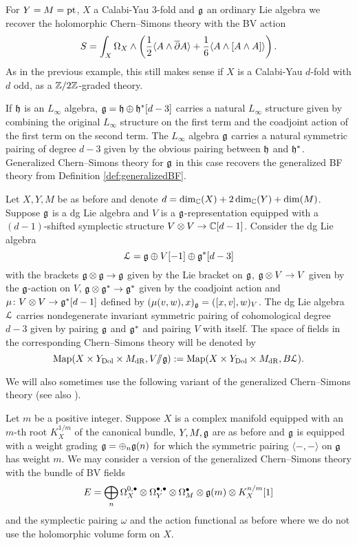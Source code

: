 \documentclass[10pt, oneside]{article}
\newcommand{\ham}{/\!\!/}
\begin{document}
\begin{example}
For $Y=M=\operatorname{pt}$, $X$ a Calabi-Yau 3-fold and $\mathfrak g$ an ordinary Lie algebra we recover the holomorphic Chern--Simons theory with the BV action
\[S = \int_X \Omega_X\wedge \left(\frac{1}{2}\langle A\wedge \overline{\partial} A\rangle + \frac{1}{6}\langle A\wedge [A\wedge A]\rangle\right).\]
As in the previous example, this still makes sense if $X$ is a Calabi-Yau $d$-fold with $d$ odd, as a $\mathbb Z/2\mathbb Z$-graded theory.
\end{example}

\begin{example}
If $\mathfrak h$ is an $L_\infty$ algebra, $\mathfrak g = \mathfrak h \oplus \mathfrak h^*[d-3]$ carries a natural $L_\infty$ structure given by combining the original $L_\infty$ structure on the first term and the coadjoint action of the first term on the second term. The $L_\infty$ algebra $\mathfrak g$ carries a natural symmetric pairing of degree $d-3$ given by the obvious pairing between $\mathfrak h$ and $\mathfrak h^*$. Generalized Chern--Simons theory for $\mathfrak g$ in this case recovers the generalized BF theory from Definition \ref{def:generalizedBF}.
\label{ex:CSBF}
\end{example}

\begin{example}
Let $X,Y,M$ be as before and denote $d = \dim_\mathbb C(X) + 2\dim_\mathbb C(Y) + \dim(M)$. Suppose $\mathfrak g$ is a dg Lie algebra and $V$ is a $\mathfrak g$-representation equipped with a $(d-1)$-shifted symplectic structure $V\otimes V\rightarrow  \mathbb C[d- 1]$. Consider the dg Lie algebra
\[\mathcal L = \mathfrak g\oplus V[-1]\oplus \mathfrak g^*[d-3]\]
with the brackets $\mathfrak g\otimes \mathfrak g\rightarrow \mathfrak g$ given by the Lie bracket on $\mathfrak g$, $\mathfrak g\otimes V\rightarrow V$ given by the $\mathfrak g$-action on $V$, $\mathfrak g\otimes \mathfrak g^*\rightarrow \mathfrak g^*$ given by the coadjoint action and $\mu\colon V\otimes V\rightarrow \mathfrak g^*[d-1]$ defined by $(\mu(v, w), x)_\mathfrak g = ([x, v], w)_V$. The dg Lie algebra $\mathcal L$ carries nondegenerate invariant symmetric pairing of cohomological degree $d-3$ given by pairing $\mathfrak g$ and $\mathfrak g^*$ and pairing $V$ with itself. The space of fields in the corresponding Chern--Simons theory will be denoted by
\[\map(X\times Y_{\mr{Dol}}\times M_{\mr{dR}}, V \ham \fg):= \map(X\times Y_{\mr{Dol}}\times M_{\mr{dR}}, B \cL).\]
\label{ex:CSHamiltonianreduction}
\end{example}

We will also sometimes use the following variant of the generalized Chern--Simons theory (see also \cite{GinzburgRozenblyum}).

\begin{definition}
Let $m$ be a positive integer. Suppose $X$ is a complex manifold equipped with an $m$-th root $K_X^{1/m}$ of the canonical bundle, $Y, M, \mathfrak g$ are as before and $\mathfrak g$ is equipped with a weight grading $\mathfrak g=\oplus_n \mathfrak g(n)$ for which the symmetric pairing $\langle -, -\rangle$ on $\mathfrak g$ has weight $m$. We may consider a version of the generalized Chern--Simons theory with the bundle of BV fields
\[E = \bigoplus_n \Omega^{0,\bullet}_X \otimes \Omega^{\bullet,\bullet}_Y \otimes \Omega^\bullet_M \otimes \mathfrak g(m)\otimes K_X^{n/m} [1]\]
and the symplectic pairing $\omega$ and the action functional as before where we do not use the holomorphic volume form on $X$.
\end{definition}
\end{document}
